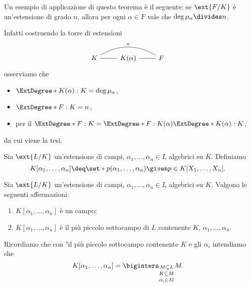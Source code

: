 Un esempio di applicazione di questo teorema è il seguente: se $\ext{F/K}$ è un'estensione di grado $n$, allora per ogni $\alpha \in F$ vale che $\deg \mu_\alpha \divides n$.

Infatti costruendo la torre di estensioni \[
    \begin{tikzcd}[every arrow/.append style={dash}]
        K \arrow[r] \arrow[rr, bend left, "n"] & K(\alpha) \arrow[r] & F
    \end{tikzcd}    
\] osserviamo che \begin{itemize}
    \item $\ExtDegree*{K(\alpha) : K} = \deg \mu_\alpha$,
    \item $\ExtDegree*{F : K} = n$,
    \item per il  $\ExtDegree*{F : K} = \ExtDegree*{F : K(\alpha)}\ExtDegree*{K(\alpha) : K}$,
\end{itemize}
da cui viene la tesi.

\begin{definition}
    Sia $\ext{L / K}$ un'estensione di campi, $\alpha_1, \dots, \alpha_n \in L$ algebrici su $K$. Definiamo \[
        K[\alpha_1, \dots, \alpha_n] \deq \set*{ p(\alpha_1, \dots, \alpha_n) \given p \in K[X_1, \dots, X_n] }.    
    \]
\end{definition}

\begin{proposition}
    Sia $\ext{L / K}$ un'estensione di campi, $\alpha_1, \dots, \alpha_n \in L$ algebrici su $K$. Valgono le seguenti affermazioni:
    \begin{enumerate}[label={(\roman*)}]
        \item $K[\alpha_1, \dots, \alpha_n]$ è un campo;
        \item $K[\alpha_1, \dots, \alpha_n]$ è il più piccolo sottocampo di $L$ contenente $K$, $\alpha_1, \dots, \alpha_n$.
    \end{enumerate}
\end{proposition}

Ricordiamo che con "il più piccolo sottocampo contenente $K$ e gli $\alpha_i$ intendiamo che \[
    K[\alpha_1, \dots, \alpha_n] = \biginters_{\substack{M \subseteq L \\[2pt] K \subseteq M \\[2pt] \alpha_i \in M}} M.    
\]

